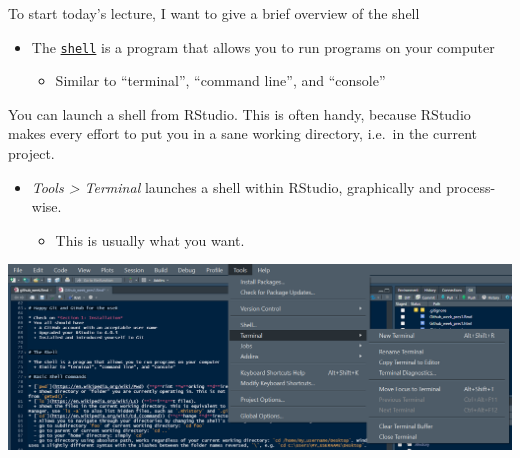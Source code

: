 \documentclass[
  ignorenonframetext,
]{beamer}
\providecommand{\tightlist}{%
  \setlength{\itemsep}{0pt}\setlength{\parskip}{0pt}}
\begin{document}
\begin{frame}[fragile]{To start today's lecture, I want to give a brief
overview of the shell}
\protect\hypertarget{to-start-todays-lecture-i-want-to-give-a-brief-overview-of-the-shell}{}

\begin{itemize}
\tightlist
\item
  The \href{https://happygitwithr.com/shell.html}{\texttt{shell}} is a
  program that allows you to run programs on your computer

  \begin{itemize}
  \tightlist
  \item
    Similar to ``terminal'', ``command line'', and ``console''
  \end{itemize}
\end{itemize}

You can launch a shell from RStudio. This is often handy, because
RStudio makes every effort to put you in a sane working directory,
i.e.~in the current project.

\begin{itemize}
\tightlist
\item
  \emph{Tools \textgreater{} Terminal} launches a shell within RStudio,
  graphically and process-wise.

  \begin{itemize}
  \tightlist
  \item
    This is usually what you want.
  \end{itemize}
\end{itemize}

\includegraphics{pres_figs/terminal.png}

\end{frame}
\end{document}
